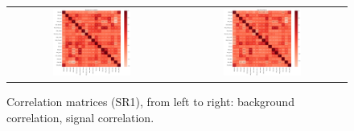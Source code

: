 \begin{figure}[tbh!]
 \begin{center}
 \begin{tabular}{cc}
  \includegraphics[width=0.48\textwidth]{figures/Part3/BDT/corr_bkg_SR1}&
  \includegraphics[width=0.48\textwidth]{figures/Part3/BDT/corr_signal_SR1}\\
 \end{tabular}
 \caption{Correlation matrices (SR1), from left to right: background correlation, signal correlation.}
 \label{fig:Ranking}
 \end{center}
\end{figure}


